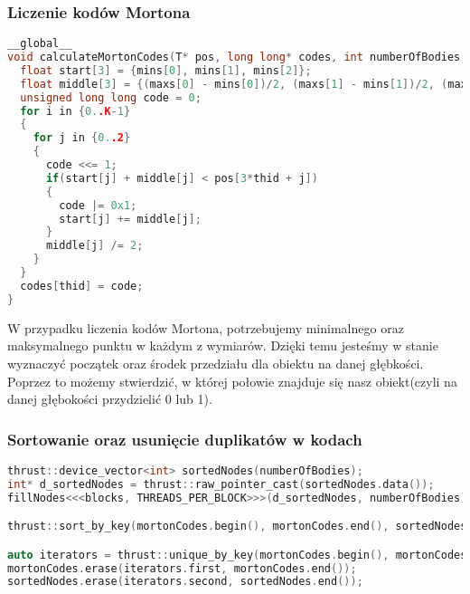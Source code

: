 \documentclass[14pt,twoside,a4paper]{article}
\theoremstyle{definition}
\begin{document}
\subsubsection{\large Liczenie kodów Mortona}
\begin{lstlisting}[language=C++, frame=single, framerule=2pt, caption=Krok 1]
__global__
void calculateMortonCodes(T* pos, long long* codes, int numberOfBodies, T* mins, T* maxs) {
  float start[3] = {mins[0], mins[1], mins[2]};
  float middle[3] = {(maxs[0] - mins[0])/2, (maxs[1] - mins[1])/2, (maxs[2] - mins[2])/2};
  unsigned long long code = 0;
  for i in {0..K-1} 
  {
    for j in {0..2}
    {
      code <<= 1;
      if(start[j] + middle[j] < pos[3*thid + j]) 
      {
        code |= 0x1;
        start[j] += middle[j];
      }
      middle[j] /= 2;
    }
  }
  codes[thid] = code;
}
\end{lstlisting}
W przypadku liczenia kodów Mortona, potrzebujemy minimalnego oraz maksymalnego punktu w każdym z wymiarów. Dzięki temu jesteśmy w stanie wyznaczyć początek oraz środek przedziału dla obiektu na danej głębkości. Poprzez to możemy stwierdzić, w której połowie znajduje się nasz obiekt(czyli na danej głębokości przydzielić 0 lub 1).
\subsubsection{\large Sortowanie oraz usunięcie duplikatów w kodach}

\begin{lstlisting}[language=C++, frame=single, framerule=2pt, caption=Kroki 2-4]
thrust::device_vector<int> sortedNodes(numberOfBodies);
int* d_sortedNodes = thrust::raw_pointer_cast(sortedNodes.data());
fillNodes<<<blocks, THREADS_PER_BLOCK>>>(d_sortedNodes, numberOfBodies);

thrust::sort_by_key(mortonCodes.begin(), mortonCodes.end(), sortedNodes.begin());  

auto iterators = thrust::unique_by_key(mortonCodes.begin(), mortonCodes.end(), sortedNodes.begin());
mortonCodes.erase(iterators.first, mortonCodes.end());
sortedNodes.erase(iterators.second, sortedNodes.end());
\end{lstlisting}
\end{document}
